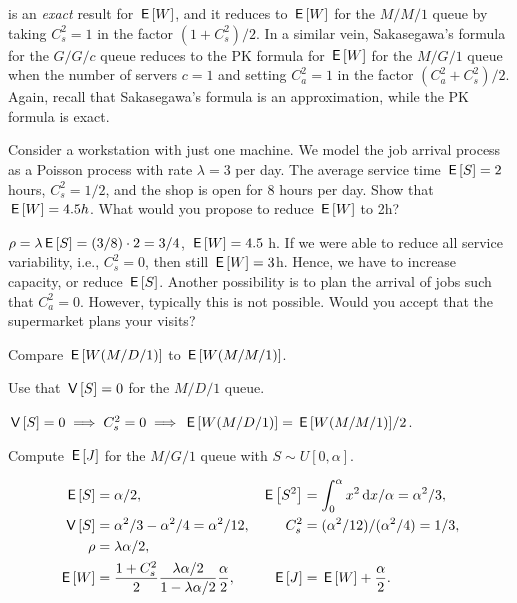  is an \emph{exact} result for $\,\mathsf{E}\left[W\right]$, and it reduces to $\,\mathsf{E}\left[W\right]$ for the $M/M/1$ queue by taking
$C_s^2=1$ in the factor $(1+C_s^2)/2$.
In a similar vein, Sakasegawa's formula for the $G/G/c$ queue reduces to the PK formula for $\,\mathsf{E}\left[W\right]$ for the $M/G/1$ queue when the number of servers $c=1$ and setting
 $C_a^2=1$ in the factor $(C_a^2+C_s^2)/2$.
Again, recall that Sakasegawa's formula is an approximation, while the PK formula is exact.



\begin{exercise}\label{ex:l-241}
 Consider a workstation with just one machine.
 We model the job arrival process as a Poisson process with rate $\lambda=3$ per day.
 The average service time $\,\mathsf{E}\left[S\right] = 2$ hours, $C^2_s = 1/2$, and the shop is open for 8 hours per day.
Show that  $\,\mathsf{E}\left[W\right] = 4.5h$. What would you propose to reduce $\,\mathsf{E}\left[W\right]$ to 2h?
\begin{solution}
$\rho = \lambda \,\mathsf{E}\left[S\right] = (3/8)\cdot 2 = 3/4$, $\,\mathsf{E}\left[W\right] = 4.5$ h.
If we were able to reduce all service variability, i.e., $C_s^2=0$, then still $\,\mathsf{E}\left[W\right] = 3$h.
Hence, we have to increase capacity, or reduce $\,\mathsf{E}\left[S\right]$.
Another possibility is to plan the arrival of jobs such that $C_a^2=0$.
However, typically this is not possible.
Would you accept that the supermarket plans your visits?
\end{solution}
\end{exercise}




\begin{exercise}
Compare  $\,\mathsf{E}\left[W(M/D/1)\right]$ to $\,\mathsf{E}\left[W(M/M/1)\right]$.
\begin{hint}
Use that $\,\mathsf{V}\left[S\right]=0$ for the $M/D/1$ queue.
\end{hint}
\begin{solution}
$\,\mathsf{V}\left[S\right] = 0 \implies C_s^2 = 0 \implies \,\mathsf{E}\left[W(M/D/1)\right] = {\,\mathsf{E}\left[W(M/M/1)\right]}/2$.
\end{solution}
\end{exercise}

\begin{exercise}
 Compute $\,\mathsf{E}\left[J\right]$ for the $M/G/1$ queue with $S\sim U[0,\alpha]$.
\begin{solution}
 \begin{align*}
\,\mathsf{E}\left[S\right] &= \alpha/2, & \,\mathsf{E}\left[S^2\right] &= \int_0^\alpha x^2 \,\textrm{d}x/\alpha = \alpha^2/3,\\
\,\mathsf{V}\left[S\right] &= \alpha^2/3 - \alpha^2/4= \alpha^2/12, & C_s^2 &= (\alpha^2/12)/(\alpha^2/4) = 1/3,\\
\rho &= \lambda \alpha/2,\\
\,\mathsf{E}\left[W\right] &= \frac{1+C_s^2}2 \frac{\lambda \alpha/2}{1-\lambda \alpha/2}\frac \alpha2, &
\,\mathsf{E}\left[J\right] &= \,\mathsf{E}\left[W\right] + \frac \alpha2.
 \end{align*}
\end{solution}
\end{exercise}


